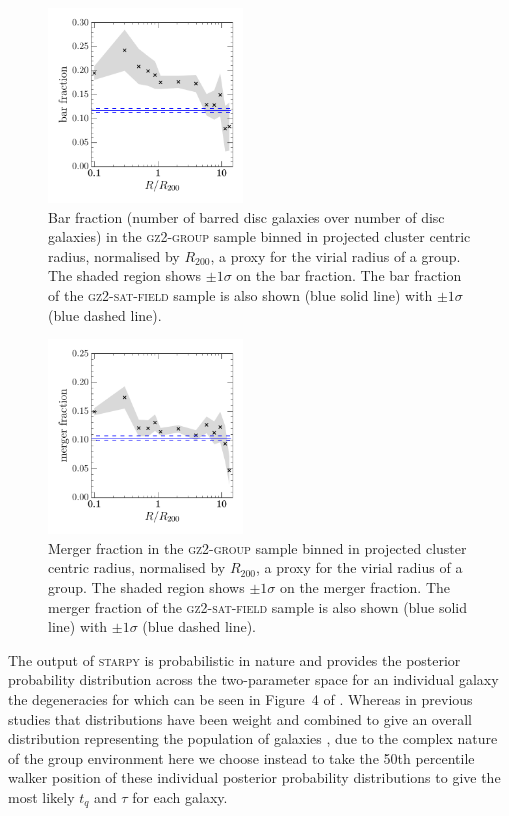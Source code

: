 \documentclass[useAMS,usenatbib]{mn2e}
\def\starpy ~{\textsc{starpy}}
\begin{document}
\begin{figure}
\includegraphics[width=0.46\textwidth]{bar_fraction_over_disc_trend_with_log_radius_sat_matched_field_cand.pdf}
\caption{Bar fraction (number of barred disc galaxies over number of disc galaxies) in the \textsc{gz2-group} sample binned in projected cluster centric radius, normalised by $R_{200}$, a proxy for the virial radius of a group. The shaded region shows $\pm1\sigma$ on the bar fraction. The bar fraction of the \textsc{gz2-sat-field} sample is also shown (blue solid line) with $\pm1\sigma$ (blue dashed line).}
\label{fig:barradius}
\end{figure}

\begin{figure}
\includegraphics[width=0.46\textwidth]{merger_fraction_trend_with_log_radius_compare_sat_field_cand.pdf}
\caption{Merger fraction in the \textsc{gz2-group} sample binned in projected cluster centric radius, normalised by $R_{200}$, a proxy for the virial radius of a group. The shaded region shows $\pm1\sigma$ on the merger fraction. The merger fraction of the \textsc{gz2-sat-field} sample is also shown (blue solid line) with $\pm1\sigma$ (blue dashed line).}
\label{fig:mergerradius}
\end{figure}

The output of \starpy  ~ is probabilistic in nature and provides the posterior probability distribution across the two-parameter space for an individual galaxy the degeneracies for which can be seen in Figure~4 of \citet{smethurst15}.  Whereas in previous studies that distributions have been weight and combined to give an overall distribution representing the population of galaxies \citep[see][]{smethurst15, smethurst16}, due to the complex nature of the group environment here we choose instead to take the 50th percentile walker position of these individual posterior probability distributions to give the most likely $t_{q}$ and $\tau$ for each galaxy. \
\end{document}
